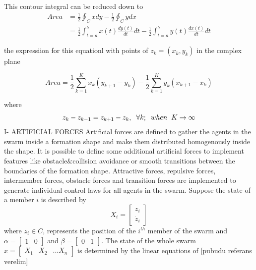 \documentclass[twoside]{article}
\begin{document}
	This contour integral can be reduced down to
	\begin{align*}
Area &= \frac{1}{2} \oint_C xdy - \frac{1}{2} \oint_C ydx \\
&= \frac{1}{2} \int_{t=a}^{b} x(t)\frac{dy(t)}{dt}dt - \frac{1}{2} \int_{t=a}^{b}y(t)\frac{dx(t)}{dt}dt
	\end{align*}
		
			the expressiion for this equationl with points of  $z_k = (x_k,y_k)$ in the complex plane
			
			\begin{equation}
       Area = \frac{1}{2} \sum_{k=1}^{K} x_k(y_{k+1} - y_k) - \frac{1}{2} \sum_{k=1}^{K}y_k(x_{k+1} - x_k)
			\end{equation}
			
				where
				\begin{equation}
				z_k - z_{k-1} = z_{k+1} - z_k, \hspace{0.2cm}  \forall k ;  \hspace{0.2cm} when  \hspace{0.2cm} K \to\infty
				\end{equation}
			I- ARTIFICIAL FORCES
			Artificial forces are defined to gather the agents in the swarm inside a formation shape and make them distributed homogenously inside the shape. It is possible to define some additional artificial forces to implement features like obstacle$\&$collision avoidance or smooth transitions between the boundaries of the formation shape. Attractive forces, repulsive forces, intermember forces, obstacle forces and transition forces are implemented to generate individual control laws for all agents in the swarm. Suppose the state of a member $i$ is described by
			\begin{equation}
X_i = \begin{bmatrix}
z_i\\ \dot{z}_i
\end{bmatrix}
			\end{equation}
			where  $z_i \in C$, represents the position of the $i^{th}$ member of the swarm and $\alpha = \begin{bmatrix}
1 & 0
			\end{bmatrix}$ and $\beta = \begin{bmatrix}
0 & 1
			\end{bmatrix}$. The state of the whole swarm $x= \begin{bmatrix}
X_1 & X_2 & ... X_n
			\end{bmatrix}$ is determined by the linear equations of [pubudu referans verelim]
\end{document}

